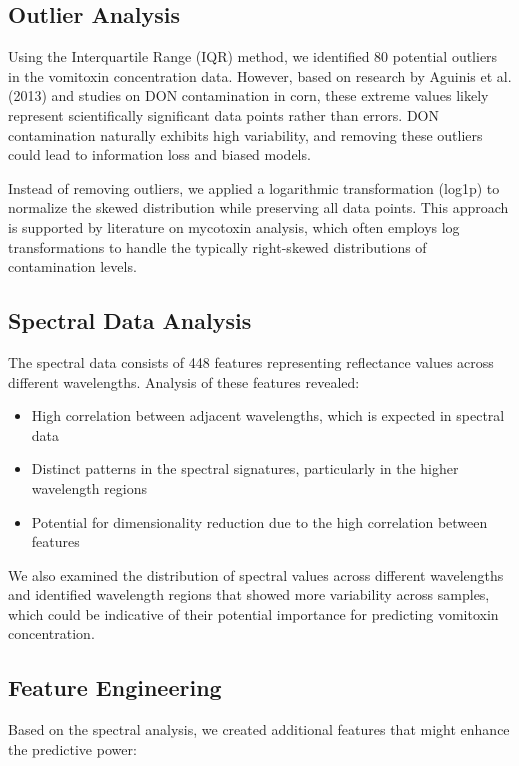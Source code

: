 \documentclass[12pt,a4paper]{article}
\begin{document}
\subsection{Outlier Analysis}

Using the Interquartile Range (IQR) method, we identified 80 potential outliers in the vomitoxin concentration data. However, based on research by Aguinis et al. (2013) and studies on DON contamination in corn, these extreme values likely represent scientifically significant data points rather than errors. DON contamination naturally exhibits high variability, and removing these outliers could lead to information loss and biased models.

Instead of removing outliers, we applied a logarithmic transformation (log1p) to normalize the skewed distribution while preserving all data points. This approach is supported by literature on mycotoxin analysis, which often employs log transformations to handle the typically right-skewed distributions of contamination levels.

\subsection{Spectral Data Analysis}

The spectral data consists of 448 features representing reflectance values across different wavelengths. Analysis of these features revealed:

\begin{itemize}
    \item High correlation between adjacent wavelengths, which is expected in spectral data
    \item Distinct patterns in the spectral signatures, particularly in the higher wavelength regions
    \item Potential for dimensionality reduction due to the high correlation between features
\end{itemize}

We also examined the distribution of spectral values across different wavelengths and identified wavelength regions that showed more variability across samples, which could be indicative of their potential importance for predicting vomitoxin concentration.

\subsection{Feature Engineering}

Based on the spectral analysis, we created additional features that might enhance the predictive power:
\end{document}
